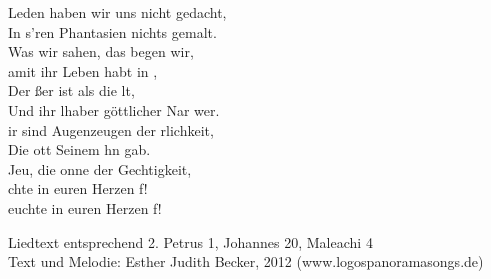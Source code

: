 
Leden haben wir uns nicht gedacht,\\
In s'ren Phantasien nichts gemalt.\\
Was wir sahen, das begen wir,\\
amit ihr Leben habt in ,\\
Der ßer ist als die lt,\\
Und ihr lhaber göttlicher Nar wer.\\

ir sind Augenzeugen der rlichkeit,\\
Die ott Seinem hn gab.\\
Jeu, die onne der Gechtigkeit,\\
chte in euren Herzen f!\\
euchte in euren Herzen f!\\

\begin{footnotesize}
Liedtext entsprechend 2. Petrus 1, Johannes 20, Maleachi 4\\
Text und Melodie: Esther Judith Becker, 2012 (www.logospanoramasongs.de)
\end{footnotesize}